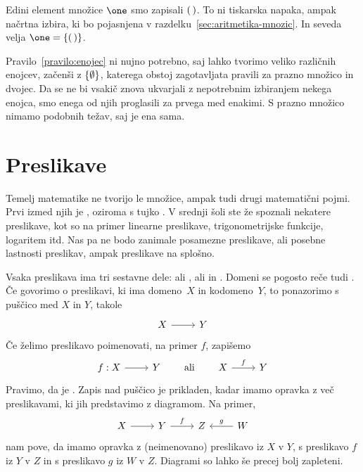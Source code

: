 Edini element množice $\one$ smo zapisali $(\,)$. To ni tiskarska napaka,
ampak načrtna izbira, ki bo pojasnjena v razdelku~\ref{sec:aritmetika-mnozic}.
In seveda velja $\one = \set{\unit}$.

Pravilo~\ref{pravilo:enojec} ni nujno potrebno, saj lahko tvorimo veliko različnih enojcev,
začenši z $\left\{\emptyset\right\}$, katerega obstoj zagotavljata pravili za prazno množico in dvojec.
Da se ne bi vsakič znova ukvarjali z nepotrebnim izbiranjem nekega enojca, smo enega od njih
proglasili za prvega med enakimi. S prazno množico nimamo podobnih težav, saj je ena sama.

\section{Preslikave}
\label{sec:preslikave}

Temelj matematike ne tvorijo le množice, ampak tudi drugi matematični pojmi. Prvi izmed
njih je , oziroma s tujko . V srednji šoli ste že spoznali
nekatere preslikave, kot so na primer linearne preslikave, trigonometrijske funkcije,
logaritem itd. Nas pa ne bodo zanimale posamezne preslikave, ali posebne lastnosti
preslikav, ampak preslikave na splošno.

Vsaka preslikava ima tri sestavne dele:  ali ,
 ali  in . Domeni se pogosto reče tudi
. Če govorimo o preslikavi, ki ima domeno~$X$ in kodomeno~$Y$, to
ponazorimo s puščico med $X$ in $Y$, takole
%
\begin{equation*}
  \begin{tikzcd}
    X \arrow[r] & Y
  \end{tikzcd}
\end{equation*}
%
Če želimo preslikavo poimenovati, na primer $f$, zapišemo
%
\begin{equation*}
  \begin{tikzcd}
    f : X \arrow[r] & Y
  \end{tikzcd}
  \qquad\text{ali}\qquad
  \begin{tikzcd}
    X \arrow[r, "f"] & Y
  \end{tikzcd}
\end{equation*}
%
Pravimo, da je . Zapis nad puščico je prikladen, kadar
imamo opravka z več preslikavami, ki jih predstavimo z diagramom. Na primer,
%
\begin{equation*}
  \begin{tikzcd}
    X \arrow[r] & Y \arrow[r, "f"] & Z & W \arrow[l, "g"{swap}]
  \end{tikzcd}
\end{equation*}
%
nam pove, da imamo opravka z (neimenovano) preslikavo iz $X$ v $Y$, s preslikavo $f$ iz
$Y$ v $Z$ in s preslikavo $g$ iz $W$ v $Z$. Diagrami so lahko še precej bolj zapleteni.

